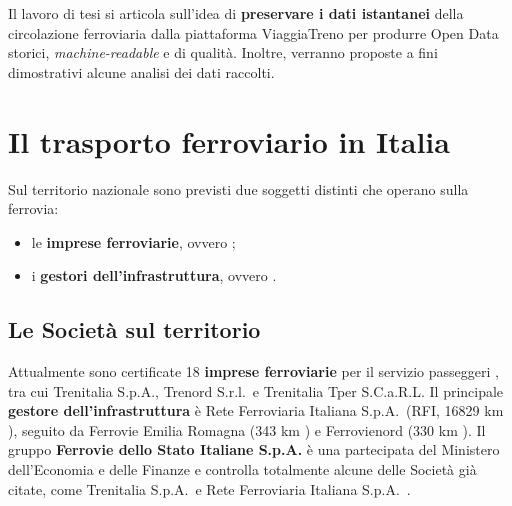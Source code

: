 \documentclass[12pt,italian]{report}
\begin{document}
Il lavoro di tesi si articola sull’idea di \textbf{preservare i dati
    istantanei} della circolazione ferroviaria dalla piattaforma
ViaggiaTreno per produrre Open Data storici, \textit{machine-readable}
e di qualità.  Inoltre, verranno proposte a fini dimostrativi alcune
analisi dei dati raccolti.

\section{Il trasporto ferroviario in Italia}

Sul territorio nazionale sono previsti due soggetti distinti che
operano sulla ferrovia:
\begin{itemize}
	\item le \textbf{imprese ferroviarie}, ovvero ;
	\item i \textbf{gestori dell'infrastruttura}, ovvero
    .
\end{itemize}

\subsection{Le Società sul territorio}
\label{societa_territorio}

Attualmente sono certificate 18 \textbf{imprese ferroviarie} per il
servizio passeggeri \cite{ElencoIF}, tra cui Trenitalia S.p.A.,
Trenord S.r.l.\ e Trenitalia Tper S.C.a.R.L.  Il principale
\textbf{gestore dell'infrastruttura} è Rete Ferroviaria Italiana
S.p.A.\ (RFI, 16829 km \cite{RfiKm}), seguito da Ferrovie Emilia
Romagna (343 km \cite{FerKm}) e Ferrovienord (330 km
\cite{FerNordKm}).  Il gruppo \textbf{Ferrovie dello Stato Italiane
    S.p.A.} è una partecipata del Ministero dell'Economia e delle
Finanze \cite{MefGruppoFS} e controlla totalmente alcune delle Società
già citate, come Trenitalia S.p.A.\ e Rete Ferroviaria Italiana
S.p.A.\ \cite{ControllateFS}.
\end{document}
